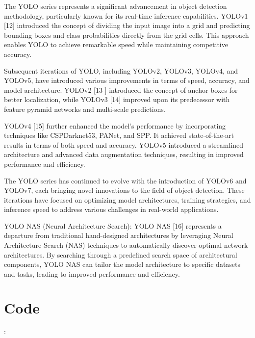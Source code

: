 The YOLO series represents a significant advancement in object detection methodology, particularly known for its real-time inference capabilities. YOLOv1 [12] introduced the concept of dividing the input image into a grid and predicting bounding boxes and class probabilities directly from the grid cells. This approach enables YOLO to achieve remarkable speed while maintaining competitive accuracy.

Subsequent iterations of YOLO, including YOLOv2, YOLOv3, YOLOv4, and YOLOv5, have introduced various improvements in terms of speed, accuracy, and model architecture. YOLOv2 [13 ] introduced the concept of anchor boxes for better localization, while YOLOv3 [14] improved upon its predecessor with feature pyramid networks and multi-scale predictions.

YOLOv4 [15] further enhanced the model's performance by incorporating techniques like CSPDarknet53, PANet, and SPP. It achieved state-of-the-art results in terms of both speed and accuracy. YOLOv5 introduced a streamlined architecture and advanced data augmentation techniques, resulting in improved performance and efficiency.

The YOLO series has continued to evolve with the introduction of YOLOv6 and YOLOv7, each bringing novel innovations to the field of object detection. These iterations have focused on optimizing model architectures, training strategies, and inference speed to address various challenges in real-world applications.

YOLO NAS (Neural Architecture Search): YOLO NAS [16] represents a departure from traditional hand-designed architectures by leveraging Neural Architecture Search (NAS) techniques to automatically discover optimal network architectures. By searching through a predefined search space of architectural components, YOLO NAS can tailor the model architecture to specific datasets and tasks, leading to improved performance and efficiency.


\section{Code}:

